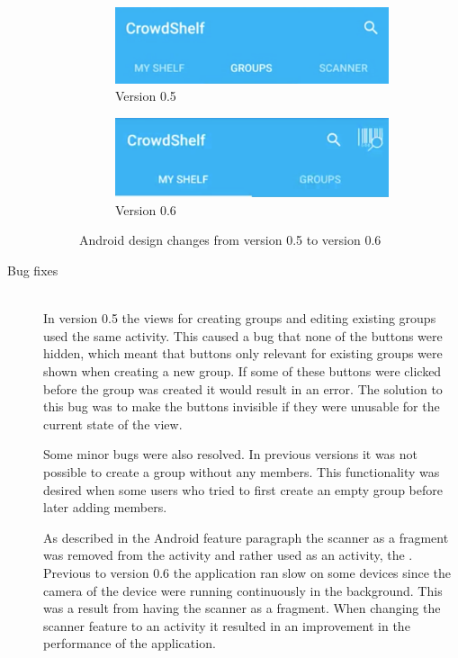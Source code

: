 \begin{description}
\begin{figure}
\centering
\begin{subfigure}{.5\textwidth}
  \centering
  \includegraphics[width=.8\textwidth]{figs/v05/AndroidDesign-05.png}
  \caption{Version 0.5}
  \label{fig:androidcompareDesign05}
\end{subfigure}%
\begin{subfigure}{.5\textwidth}
  \centering
  \includegraphics[width=.8\textwidth]{figs/v06/Android/AndroidDesign-06.png}
  \caption{Version 0.6}
  \label{fig:androidcompareDesign06}
\end{subfigure}
\caption{Android design changes from version 0.5 to version 0.6}
\label{fig:AndroidDesignComparison06}
\end{figure}

    \item[Bug fixes] \hfill\\
In version 0.5 the views for creating groups and editing existing groups used the same activity. This caused a bug that none of the buttons were hidden, which meant that buttons only relevant for existing groups were shown when creating a new group. If some of these buttons were clicked before the group was created it would result in an error. The solution to this bug was to make the buttons invisible if they were unusable for the current state of the view. 

Some minor bugs were also resolved. In previous versions it was not possible to create a group without any members. This functionality was desired when some users who tried to first create an empty group before later adding members.

As described in the Android feature paragraph the scanner as a fragment was removed from the  activity and rather used as an activity, the . Previous to version 0.6 the application ran slow on some devices since the camera of the device were running continuously in the background. This was a result from having the scanner as a fragment. When changing the scanner feature to an activity it resulted in an improvement in the performance of the application.


\end{description}
